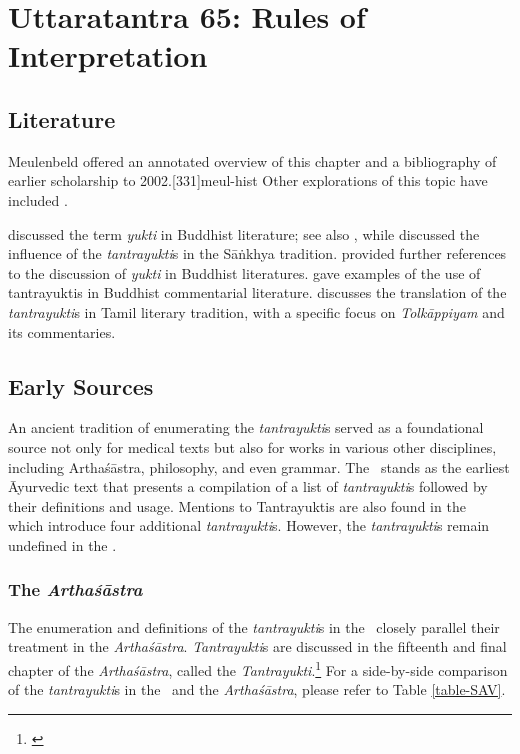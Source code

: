 
\chapter[Uttaratantra 65:  Rules of Interpretation]{Uttaratantra 65:  
Rules of Interpretation}

\section{Literature} 

Meulenbeld offered an annotated overview of this chapter and a bibliography
of earlier scholarship to 2002.[331]{meul-hist} 
Other explorations  of this topic have included \cite{
dasg-1952,
lele-1981,
mejo-2000,
nara-1949,
ober-1968,
scha-1993,
sing-2003,
muth-1976,
comb-1994}. 


 \citet{sche-1981} discussed the term \emph{yukti} in Buddhist
literature; see also \cite[444--446]{biar-1964} \cite[343--345]{pret-1991}, 
while
\cite{frau-1958} discussed the influence of the \emph{tantrayukti}s in the 
Sāṅkhya tradition.
\citet[105--106, fn.\,109]{prei-2013} provided further references to the
discussion of \emph{yukti} in Buddhist literatures. \citet{mane-2008}
gave examples of the use of tantrayuktis in Buddhist commentarial
literature. \citet{chev-2009} discusses the translation of the 
\emph{tantrayukti}s in Tamil literary tradition, with a specific focus on 
\emph{Tolkāppiyam} and its commentaries.


\section{Early Sources}

An ancient tradition of enumerating the \emph{tantrayukti}s served as a 
foundational source not only for medical texts but also for works in various other 
disciplines, including Arthaśāstra, philosophy, and even grammar. The \SS\  
stands 
as the earliest Āyurvedic text that presents a compilation of a list of 
\emph{tantrayukti}s followed by their definitions and usage. Mentions to 
Tantrayuktis are also found in the \CS\  \Ca{8.12}{} which introduce four 
additional 
\emph{tantrayukti}s. However, the \emph{tantrayukti}s remain undefined in 
the 
\CS. 

\subsection{The \emph{Arthaśāstra}} 
The enumeration and definitions of the \emph{tantrayukti}s in the 
\SS\  closely parallel their treatment in the \emph{Arthaśāstra}. 
\emph{Tantrayukti}s are discussed in the fifteenth and final chapter of the 
\emph{Arthaśāstra}, called the 
\emph{Tantrayukti}.\footnote{\cite[280--283]{kang-1960}} For a side-by-side 
comparison of the \emph{tantrayukti}s in the \SS\ and the \emph{Arthaśāstra}, 
please refer to Table \ref{table-SAV}.

